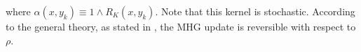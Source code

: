 where $\alpha(x,y_k) \equiv 1\wedge R_K (x,y_k)$. Note that this kernel is stochastic. According to the general theory, as stated in \cite{CharlesJ.Geyer}, the MHG update is reversible with respect to $\rho$. 







	 	

 

	 	

 
